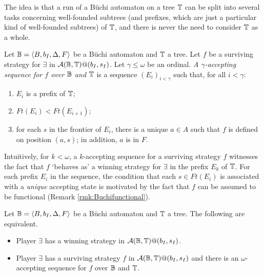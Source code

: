 The idea is that a run of a B\"{u}chi automaton on a tree $\mathbb{T}$ can be split into several tasks concerning well-founded subtrees (and prefixes, which are just a particular kind of well-founded subtrees) of $\mathbb{T}$, and there is never the need to consider $\mathbb{T}$ as a whole. %

\begin{definition}\label{DEF_accepting_sequence}
Let $\mathbb{B} = \langle B,b_I,\Delta,F\rangle$ be a B\"{u}chi automaton and $\mathbb{T}$ a tree. Let $f$ be a surviving strategy for $\exists$ in $\mathcal{A}(\mathbb{B},\mathbb{T})@(b_I,s_I)$. Let $\gamma \leq \omega$ be an ordinal. \emph{A $\gamma$-accepting sequence for $f$ over $\mathbb{B}$ and $\mathbb{T}$} is a sequence $(E_i)_{i < \gamma}$ such that, for all $i < \gamma$:
\begin{enumerate}
\item $E_i$ is a prefix of $\mathbb{T}$;
\item $\mathit{Ft}(E_i) < \mathit{Ft}(E_{i+1})$;
\item for each $s$ in the frontier of $E_i$, there is a unique $a\in A$ such
   that $f$ is defined on position $(a,s)$; in addition, $a$ is in $F$.
\end{enumerate}
\end{definition}

Intuitively, for $k <\omega$, a $k$-accepting sequence for a surviving strategy
$f$ witnesses the fact that $f$ `behaves as' a winning strategy for $\exists$
in the prefix $E_k$ of $\mathbb{T}$. For each prefix $E_i$ in the sequence, the
condition that each $s \in \mathit{Ft}(E_i)$ is associated with a \emph{unique}
accepting state is motivated by the fact that $f$ can be assumed to be
functional (Remark \ref{rmk:Buchifunctional}).

\begin{proposition}\label{PROP_Buchi_finite_segments}
Let $\mathbb{B} = \langle B,b_I,\Delta,F\rangle$ be a B\"{u}chi automaton and $\mathbb{T}$ a tree. The following are equivalent.
\begin{itemize}
  \item Player $\exists$ has a winning strategy in $\mathcal{A}(\mathbb{B},\mathbb{T})@(b_I,s_I)$.
  \item Player $\exists$ has a surviving strategy $f$ in $\mathcal{A}(\mathbb{B},\mathbb{T})@(b_I,s_I)$ and there is an $\omega$-accepting sequence for $f$ over $\mathbb{B}$ and $\mathbb{T}$.
\end{itemize}
\end{proposition}

